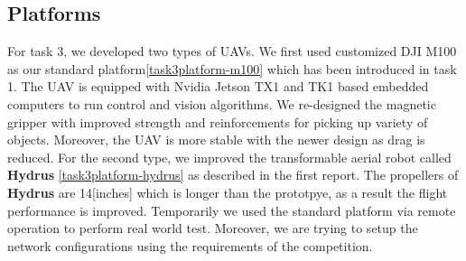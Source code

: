 \documentclass{standalone}
\begin{document}
\subsection{Platforms}

For task 3, we developed two types of UAVs. We first used customized
DJI M100 as our standard platform\ref{task3platform-m100} which has
been introduced in task 1. The UAV is equipped with Nvidia Jetson TX1
and TK1 based embedded computers to run control and vision
algorithms. 
We re-designed the magnetic gripper with improved strength and
reinforcements for picking up variety of objects. Moreover, the UAV is
more stable with the newer design as drag is reduced.
For the second type, we improved the transformable aerial robot called
{\bf Hydrus} \ref{task3platform-hydrus} as described in the first
report. The propellers of {\bf Hydrus} are 14[inches] which is longer
than the prototpye, as a result the flight performance is
improved. Temporarily we used the standard platform via remote operation to
perform real world test. Moreover, we are trying to setup the network
configurations using the requirements of the competition. 

\end{document}

